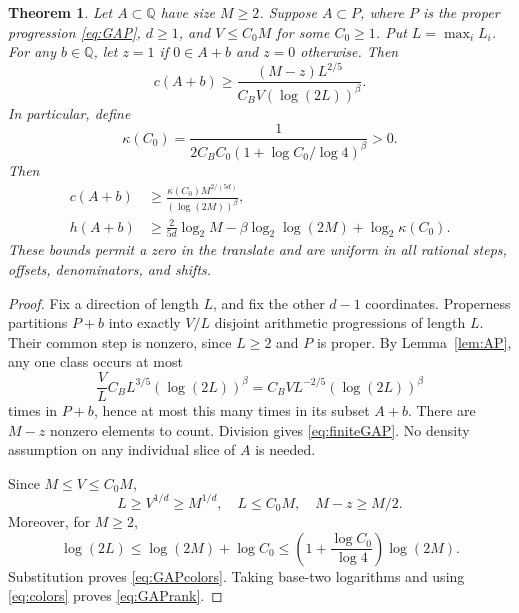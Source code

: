 \documentclass[11pt,letterpaper]{article}
\newtheorem{theorem}{Theorem}[section]
\theoremstyle{remark}\newtheorem{remark}[theorem]{Remark}
\newcommand{\Q}{\mathbb Q}
\begin{document}
\begin{theorem}\label{thm:GAP}
Let $A\subset\Q$ have size $M\ge2$. Suppose $A\subset P$, where $P$ is the proper progression \eqref{eq:GAP}, $d\ge1$, and $V\le C_0M$ for some $C_0\ge1$. Put $L=\max_iL_i$. For any $b\in\Q$, let $z=1$ if $0\in A+b$ and $z=0$ otherwise. Then
\begin{equation}\label{eq:finiteGAP}
 c(A+b)\ge\frac{(M-z)L^{2/5}}{C_B V(\log(2L))^{\beta}}.
\end{equation}
In particular, define
\[
 \kappa(C_0)=\frac{1}{2C_BC_0(1+\log C_0/\log4)^{\beta}}>0.
\]
Then
\begin{align}
 c(A+b)&\ge\frac{\kappa(C_0) M^{2/(5d)}}{(\log(2M))^{\beta}},\label{eq:GAPcolors}\\
 h(A+b)&\ge\frac{2}{5d}\log_2M-\beta\log_2\log(2M)+\log_2\kappa(C_0).
 \label{eq:GAPrank}
\end{align}
These bounds permit a zero in the translate and are uniform in all rational steps, offsets, denominators, and shifts.
\end{theorem}
\begin{proof}
Fix a direction of length $L$, and fix the other $d-1$ coordinates. Properness partitions $P+b$ into exactly $V/L$ disjoint arithmetic progressions of length $L$. Their common step is nonzero, since $L\ge2$ and $P$ is proper. By Lemma~\ref{lem:AP}, any one class occurs at most
\[
 \frac VL C_B L^{3/5}(\log(2L))^{\beta}
   = C_B V L^{-2/5}(\log(2L))^{\beta}
\]
times in $P+b$, hence at most this many times in its subset $A+b$. There are $M-z$ nonzero elements to count. Division gives \eqref{eq:finiteGAP}. No density assumption on any individual slice of $A$ is needed.

Since $M\le V\le C_0M$,
\[
 L\ge V^{1/d}\ge M^{1/d},\quad L\le C_0M,\quad M-z\ge M/2.
\]
Moreover, for $M\ge2$,
\[
 \log(2L)\le\log(2M)+\log C_0
 \le\left(1+\frac{\log C_0}{\log4}\right)\log(2M).
\]
Substitution proves \eqref{eq:GAPcolors}. Taking base-two logarithms and using \eqref{eq:colors} proves \eqref{eq:GAPrank}.
\end{proof}
\end{document}
